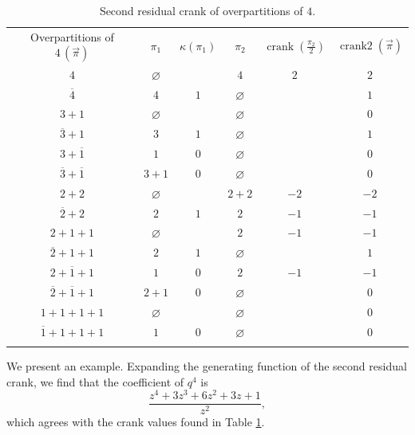 \documentclass[10pt,a4paper]{amsart}
\numberwithin{equation}{section}
\begin{document}
\begin{table}[hbt!]\centering
\caption{Second residual crank of overpartitions of $4$.}\label{t3}
\vspace{2mm}
\begin{tabular}{ c c c c c c }
Overpartitions of $4\,(\vec{\pi})$ & $\pi_1$ & $\kappa(\pi_1)$ & $\pi_2$ & $\operatorname{crank}(\frac{\pi_2}{2})$ & $\operatorname{crank2}(\vec{\pi})$ \\
 $4$                          & $\varnothing$ &     & $4$    & $2$ & $2$\\
 $\overline{4}$               & $4$    & $1$ & $\varnothing$ &     & $1$\\
 $3+1$                        & $\varnothing$ &     & $\varnothing$ &     & $0$\\
 $\overline{3}+1$             & $3$    & $1$ & $\varnothing$ &     & $1$\\
 $3+\overline{1}$             & $1$    & $0$ & $\varnothing$ &     & $0$\\
 $\overline{3}+\overline{1}$  & $3+1$  & $0$ & $\varnothing$ &     & $0$\\
 $2+2$                        & $\varnothing$ &     & $2+2$  & $-2$& \hspace{-3mm}$-2$\\
 $\overline{2}+2$             & $2$    & $1$ & $2$    & $-1$& \hspace{-3mm}$-1$\\
 $2+1+1$                      & $\varnothing$ &     & $2$    & $-1$& \hspace{-3mm}$-1$\\
 $\overline{2}+1+1$           & $2$    & $1$ & $\varnothing$ &     & $1$\\
 $2+\overline{1}+1$           & $1$    & $0$ & $2$    & $-1$& \hspace{-3mm}$-1$\\
 $\overline{2}+\overline{1}+1$& $2+1$  & $0$ & $\varnothing$ &     & $0$\\
 $1+1+1+1$                    & $\varnothing$ &     & $\varnothing$ &     & $0$\\
 $\overline{1}+1+1+1$         & $1$    & $0$ & $\varnothing$ &     & $0$\\\\
\end{tabular}
\end{table}

We present an example.
Expanding the generating function of the second residual crank, we find that the coefficient of $q^4$ is
\begin{equation*}%
\frac{z^4+3z^3+6z^2+3z+1}{z^2},
\end{equation*}
which agrees with the crank values found in Table \ref{t3}.
\end{document}
